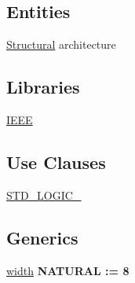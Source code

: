 \subsection*{Entities}
\begin{DoxyCompactItemize}
\item 
\hyperlink{classgeneric__comparator_1_1_structural}{Structural} architecture
\end{DoxyCompactItemize}
\subsection*{Libraries}
 \begin{DoxyCompactItemize}
\item 
\hypertarget{classgeneric__comparator_gae4f03c286607f3181e16b9aa12d0c6d4}{\hyperlink{group___majority_voter_gae4f03c286607f3181e16b9aa12d0c6d4}{I\+E\+E\+E} }\label{classgeneric__comparator_gae4f03c286607f3181e16b9aa12d0c6d4}

\end{DoxyCompactItemize}
\subsection*{Use Clauses}
 \begin{DoxyCompactItemize}
\item 
\hypertarget{classgeneric__comparator_gaa4b2b25246a821511120e3149b003563}{\hyperlink{group___majority_voter_gaa4b2b25246a821511120e3149b003563}{S\+T\+D\+\_\+\+L\+O\+G\+I\+C\+\_}   }\label{classgeneric__comparator_gaa4b2b25246a821511120e3149b003563}

\end{DoxyCompactItemize}
\subsection*{Generics}
 \begin{DoxyCompactItemize}
\item 
\hypertarget{classgeneric__comparator_ga93ec5006d2e0a77a21f35a7e3c1ca827}{\hyperlink{group___majority_voter_ga93ec5006d2e0a77a21f35a7e3c1ca827}{width} {\bfseries {\bfseries \textcolor{vhdlchar}{N\+A\+T\+U\+R\+A\+L}\textcolor{vhdlchar}{ }\textcolor{vhdlchar}{ }\textcolor{vhdlchar}{\+:}\textcolor{vhdlchar}{=}\textcolor{vhdlchar}{ }\textcolor{vhdlchar}{ } \textcolor{vhdldigit}{8} \textcolor{vhdlchar}{ }}}}\label{classgeneric__comparator_ga93ec5006d2e0a77a21f35a7e3c1ca827}

\end{DoxyCompactItemize}

